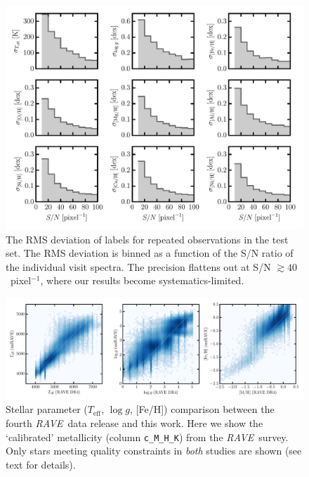 \documentclass[preprint]{aastex}
\newcommand{\acronym}[1]{{\small{#1}}}
\newcommand{\project}[1]{\textsl{#1}}
\newcommand{\rave}{\project{\acronym{RAVE}}}
\newcommand{\teff}{T_{\mathrm{eff}}}
\newcommand{\logg}{\log g}
\begin{document}
\begin{figure}[p]
\includegraphics[width=\textwidth]{repeat-visits.pdf}
\caption{The RMS deviation of labels for repeated observations in the test set.  The RMS deviation is binned as a function of the S/N ratio of the individual visit spectra.  The
precision flattens out at S/N $\gtrsim 40$~pixel$^{-1}$, where our results become systematics-limited.
\label{fig:repeat-visits}}
\end{figure}


\begin{figure}[p]
\includegraphics[width=\textwidth]{dr4-comparison.pdf}
\caption{Stellar parameter ($\teff$, $\logg$, [Fe/H]) comparison between the fourth \rave\ data release \citep{Kordopatis_2013} and this work. Here we show the `calibrated' metallicity (column \texttt{c\_M\_H\_K}) from the \rave\ survey. Only stars meeting quality constraints in \emph{both} studies are shown (see text for details).\label{fig:rave-dr4-comparison}}
\end{figure}
\end{document}
